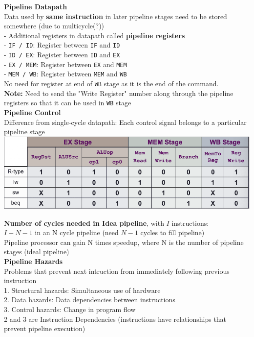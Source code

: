 \documentclass[10pt, a4paper]{article}
\newcommand{\highlight}[1]{{\color{red}\textbf{#1}}}
\begin{document}
\begin{multicols*}{3}
		\textbf{Pipeline Datapath}\\
		Data used by \highlight{same instruction} in later pipeline stages need to be stored somewhere (due to multicycle(?))\\
		- Additional registers in datapath called \highlight{pipeline registers}\\
		- \texttt{IF / ID}: Register between \texttt{IF} and \texttt{ID}\\
		- \texttt{ID / EX}: Register between \texttt{ID} and \texttt{EX}\\
		- \texttt{EX / MEM}: Register between \texttt{EX} and \texttt{MEM}\\
		- \texttt{MEM / WB}: Register between \texttt{MEM} and \texttt{WB}\\
		No need for register at end of \texttt{WB} stage as it is the end of the command.\\
		\highlight{Note:} Need to send the "Write Register" number along through the pipeline registers so that it can be used in \texttt{WB} stage\\
		
		\textbf{Pipeline Control}\\
		Difference from single-cycle datapath: Each control signal belongs to a particular pipeline stage\\
		\includegraphics[scale=.5]{./assets/groupedControls}
		
		\highlight{Number of cycles needed in Idea pipeline}, with $I$ instructions:\\
		$I + N - 1$ in an N cycle pipeline (need $N-1$ cycles to fill pipeline)\\ 

		Pipeline processor can gain N times speedup, where N is the number of pipeline stages (ideal pipeline)\\
		
		{\normalsize\textbf{Pipeline Hazards}}\\
		Problems that prevent next intruction from immediately following previous instruction\\
		1. Structural hazards: Simultaneous use of hardware\\
		2. Data hazards: Data dependencies between instructions\\
		3. Control hazards: Change in program flow\\
		2 and 3 are Instruction Dependencies (instructions have relationships that prevent pipeline execution)\\
		

\end{multicols*}
\end{document}
